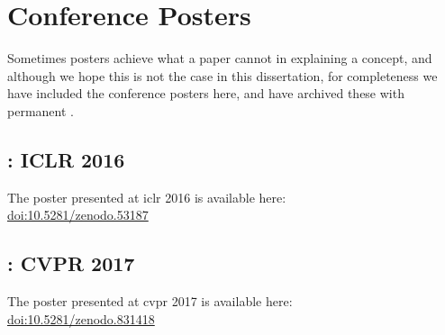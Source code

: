 \documentclass[thesis]{subfiles}
\begin{document}

\chapter{Conference Posters}
\label{posters}
Sometimes posters achieve what a paper cannot in explaining a concept, and although we hope this is not the case in this dissertation, for completeness we have included the conference posters here, and have archived these with permanent .
\section*{: ICLR 2016}
The poster presented at \gls{iclr} 2016 is available here:\\
\href{https://doi.org/10.5281/zenodo.53187}{doi:10.5281/zenodo.53187}
\afterpage{}
\section*{: CVPR 2017}
The poster presented at \gls{cvpr} 2017 is available here:\\
\href{https://doi.org/10.5281/zenodo.831418}{doi:10.5281/zenodo.831418}
\afterpage{}
\end{document}
